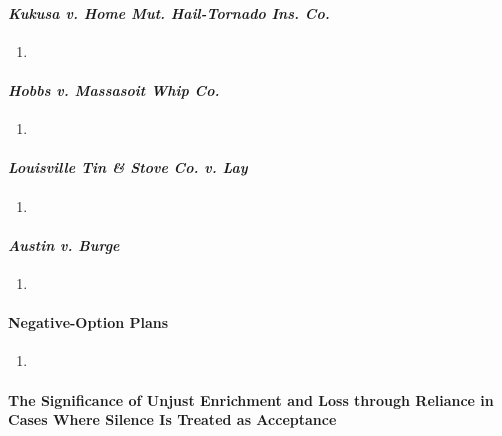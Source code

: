 \paragraph{\emph{Kukusa v. Home Mut. Hail-Tornado Ins. Co.}}

\begin{enumerate}
    \item %
\end{enumerate}

\paragraph{\emph{Hobbs v. Massasoit Whip Co.}}

\begin{enumerate}
    \item %
\end{enumerate}

\paragraph{\emph{Louisville Tin \& Stove Co. v. Lay}}

\begin{enumerate}
    \item %
\end{enumerate}

\paragraph{\emph{Austin v. Burge}}

\begin{enumerate}
    \item %
\end{enumerate}

\paragraph{Negative-Option Plans}

\begin{enumerate}
    \item %
\end{enumerate}

\paragraph{The Significance of Unjust Enrichment and Loss through Reliance in 
Cases Where Silence Is Treated as Acceptance}

